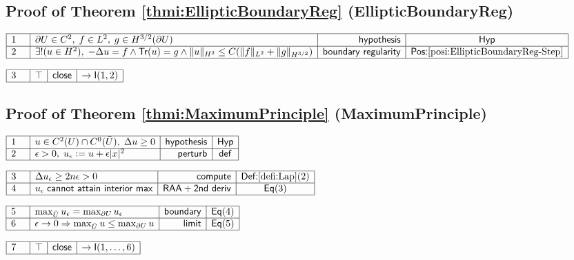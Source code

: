 \documentclass[11pt,reqno]{amsart}
\begin{document}
	\subsection*{Proof of Theorem \protect\ref{thmi:EllipticBoundaryReg} (\textsf{EllipticBoundaryReg})}
	\noindent$\begin{array}{|m{0.5cm}|l|r|c|}
	\hline
	1 & \partial U\in C^{2},\;f\in L^{2},\;g\in H^{3/2}(\partial U) & \mathsf{hypothesis} & \mathsf{Hyp} \\ \hline
	2 & \exists! (u\in H^{2}),\;-\Delta u=f\wedge\mathsf{Tr}(u)=g\wedge\|u\|_{H^{2}}\le C(\|f\|_{L^{2}}+\|g\|_{H^{3/2}}) & \mathsf{boundary\ regularity} & \textsf{Pos:}\ref{posi:EllipticBoundaryReg-Step} \\ \hline
	\end{array}$
	\par\nointerlineskip\noindent$\begin{array}{|m{0.5cm}|l|r|c|}
	\hline
	3 & \top & \mathsf{close} & \to\mathsf{I}(1,2) \\ \hline
	\end{array}$
	\medskip
	
	\subsection*{Proof of Theorem \protect\ref{thmi:MaximumPrinciple} (\textsf{MaximumPrinciple})}
	\noindent$\begin{array}{|m{0.5cm}|l|r|c|}
	\hline
	1 & u\in C^{2}(U)\cap C^{0}(\bar{U}),\;\Delta u\ge0 & \mathsf{hypothesis} & \mathsf{Hyp} \\ \hline
	2 & \epsilon>0,\;u_{\epsilon}:=u+\epsilon|x|^{2} & \mathsf{perturb} & \mathsf{def} \\ \hline
	\end{array}$
	\par\nointerlineskip\noindent$\begin{array}{|m{0.5cm}|l|r|c|}
	\hline
	3 & \Delta u_{\epsilon}\ge2n\epsilon>0 & \mathsf{compute} & \textsf{Def:}\ref{defi:Lap}(2) \\ \hline
	4 & u_{\epsilon}\;\mathsf{cannot\ attain\ interior\ max} & \mathsf{RAA+2nd\ deriv} & \mathsf{Eq}(3) \\ \hline
	\end{array}$
	\par\nointerlineskip\noindent$\begin{array}{|m{0.5cm}|l|r|c|}
	\hline
	5 & \max_{\bar{U}}u_{\epsilon}=\max_{\partial U}u_{\epsilon} & \mathsf{boundary} & \mathsf{Eq}(4) \\ \hline
	6 & \epsilon\to0\Rightarrow\max_{\bar{U}}u\le\max_{\partial U}u & \mathsf{limit} & \mathsf{Eq}(5) \\ \hline
	\end{array}$
	\par\nointerlineskip\noindent$\begin{array}{|m{0.5cm}|l|r|c|}
	\hline
	7 & \top & \mathsf{close} & \to\mathsf{I}(1,\dots,6) \\ \hline
	\end{array}$
	\medskip
	
\end{document}
